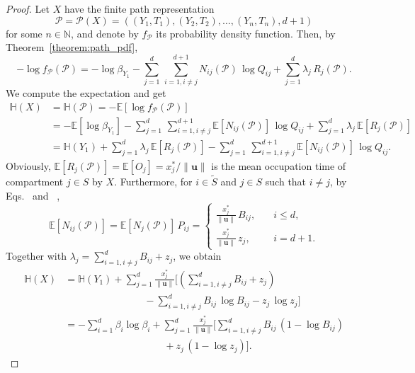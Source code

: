 \documentclass[smallextended]{svjour3}
\makeatletter
\renewcommand*{\eqref}[1]{%
  \hyperref[{#1}]{\textup{\tagform@{\ref*{#1}}}}%
}
\renewcommand{\vec}[1]{\mathbf{#1}}
\newcommand{\N}{\mathbb{N}}
\newcommand{\E}{\mathbb{E}}
\renewcommand{\H}{\mathbb{H}}
\newcommand{\suml}{\sum\limits}
\newcommand{\vnorms}[1]{\|#1\|}
\newcommand{\pdf}{probability density function}
\makeatother
\begin{document}
\begin{proof}
	Let $X$ have the finite path representation 
	\begin{equation}
		\mathcal{P}=\mathcal{P}(X)=((Y_1,T_1),(Y_2,T_2),\ldots,(Y_n,T_n),d+1)
	\end{equation}
	for some $n\in\N$, and denote by $f_{\mathcal{P}}$ its \pdf.
	Then, by Theorem~\ref{theorem:path_pdf},
	\begin{equation}
		-\log f_{\mathcal{P}}(\mathcal{P}) = -\log\beta_{Y_1} - \suml_{j=1}^d\,\suml_{i=1,i\neq j}^{d+1}N_{ij}(\mathcal{P})\,\log Q_{ij} + \suml_{j=1}^d \lambda_j\,R_j(\mathcal{P}).
	\end{equation}
	We compute the expectation and get
	\begin{equation}
    \begin{aligned}
      \H(X) &= \H(\mathcal{P}) = -\E\left[\log f_{\mathcal{P}}(\mathcal{P})\right]\\
      &= -\E\left[\log\beta_{Y_1}\right] - \suml_{j=1}^d\,\suml_{i=1,i\neq j}^{d+1}\E\left[N_{ij}(\mathcal{P})\right]\,\log Q_{ij} + \suml_{j=1}^d \lambda_j\,\E\left[R_j(\mathcal{P})\right]\\
      &= \H(Y_1) + \suml_{j=1}^d \lambda_j\,\E\left[R_j(\mathcal{P})\right] - \suml_{j=1}^d\,\suml_{i=1,i\neq j}^{d+1}\E\left[N_{ij}(\mathcal{P})\right]\,\log Q_{ij}.
    \end{aligned}
  \end{equation}
	Obviously, $\E\left[R_j(\mathcal{P})\right]=\E\left[O_j\right]=x^\ast_j/\vnorms{\vec{u}}$ is the mean occupation time of compartment $j\in S$ by $X$.
	Furthermore, for $i\in\widetilde{S}$ and $j\in S$ such that $i\neq j$, by Eqs.~\eqref{eqn:N_i} and~\eqref{eqn:P_ij},
	\begin{equation}
		\E\left[N_{ij}(\mathcal{P})\right] = \E\left[N_j(\mathcal{P})\right]\,P_{ij} = 
		\begin{cases}
			\frac{x^\ast_j}{\vnorms{\vec{u}}}\,B_{ij},\quad & i\leq d,\\
			\frac{x^\ast_j}{\vnorms{\vec{u}}}\,z_j,&i=d+1.
		\end{cases}
	\end{equation}
	Together with $\lambda_j=\sum_{i=1,i\neq j}^{d} B_{ij}+z_j$, we obtain
	\begin{equation}
    \begin{aligned}
      \H(X) &= \H(Y_1)+ \suml_{j=1}^d \frac{x^\ast_j}{\vnorms{\vec{u}}}\Bigg[\left(\suml_{i=1,i\neq j}^d B_{ij}+z_j\right)\\
      &\qquad\qquad\qquad\qquad - \suml_{i=1,i\neq j}^d B_{ij}\,\log B_{ij} - z_j\,\log z_j\Bigg]\\
      &= -\suml_{i=1}^d \beta_i\log\beta_i + \suml_{j=1}^d \frac{x^\ast_j}{\vnorms{\vec{u}}} \Bigg[\suml_{i=1,i\neq j}^d B_{ij}\,(1-\log B_{ij})\\
      &\qquad\qquad\qquad\qquad\qquad + z_j\,(1-\log z_j)\Bigg].
    \end{aligned}
  \end{equation}
\end{proof}
\end{document}
